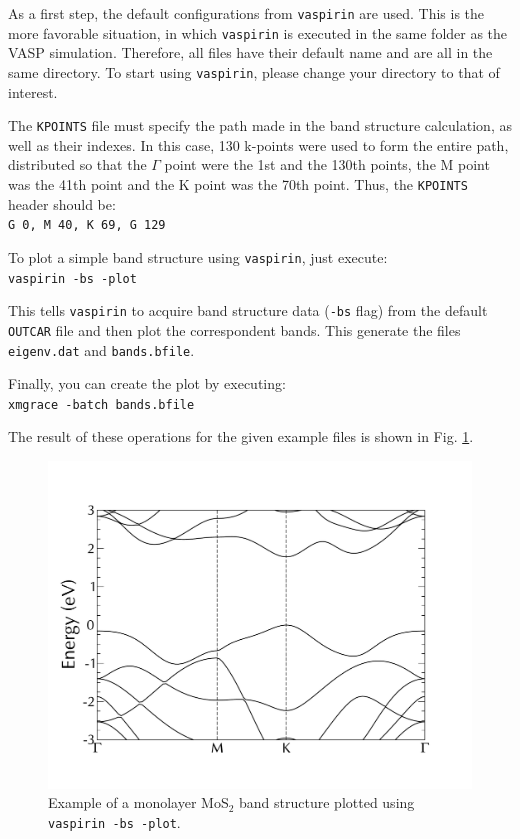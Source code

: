 \documentclass{refart}
\begin{document}
 As a first step, the default configurations from \texttt{vaspirin} are used. This is the more favorable situation, in which \texttt{vaspirin} is executed in the same folder as the VASP simulation. Therefore, all files have their default name and are all in the same directory. To start using \texttt{vaspirin}, please change your directory to that of interest.

 The \texttt{KPOINTS} file must specify the path made in the band structure calculation, as well as their indexes. In this case, 130 k-points were used to form the entire path, distributed so that the $\Gamma$ point were the 1st and the 130th points, the M point was the 41th point and the K point was the 70th point. Thus, the \texttt{KPOINTS} header should be:\\
\texttt{G 0, M 40, K 69, G 129}

 To plot a simple band structure using \texttt{vaspirin}, just execute:\\
\texttt{vaspirin -bs -plot}

This tells \texttt{vaspirin} to acquire band structure data (\texttt{-bs} flag) from the default \texttt{OUTCAR} file and then plot the correspondent bands. This generate the files \texttt{eigenv.dat} and \texttt{bands.bfile}.

 Finally, you can create the plot by executing:\\
\texttt{xmgrace -batch bands.bfile}

The result of these operations for the given example files is shown in Fig. \ref{fig:bs-plot}.

\begin{figure}[h!]
	\centering
	\includegraphics[width=\textwidth]{img/bs-plot.pdf}
	\caption{Example of a monolayer MoS$_2$ band structure plotted using \texttt{vaspirin -bs -plot}.}
	\label{fig:bs-plot}
\end{figure}
\end{document}
